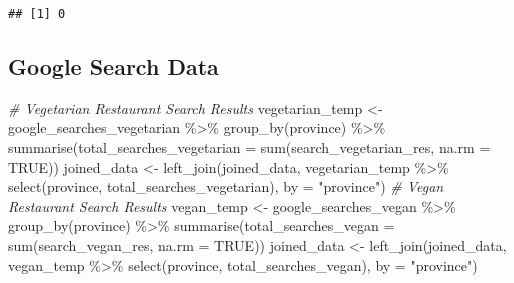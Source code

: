 \documentclass[
]{article}
\newenvironment{Shaded}{\begin{snugshade}}{\end{snugshade}}
\newcommand{\AttributeTok}[1]{\textcolor[rgb]{0.77,0.63,0.00}{#1}}
\newcommand{\CommentTok}[1]{\textcolor[rgb]{0.56,0.35,0.01}{\textit{#1}}}
\newcommand{\ConstantTok}[1]{\textcolor[rgb]{0.00,0.00,0.00}{#1}}
\newcommand{\FunctionTok}[1]{\textcolor[rgb]{0.00,0.00,0.00}{#1}}
\newcommand{\NormalTok}[1]{#1}
\newcommand{\OtherTok}[1]{\textcolor[rgb]{0.56,0.35,0.01}{#1}}
\newcommand{\SpecialCharTok}[1]{\textcolor[rgb]{0.00,0.00,0.00}{#1}}
\newcommand{\StringTok}[1]{\textcolor[rgb]{0.31,0.60,0.02}{#1}}
\begin{document}
\begin{Shaded}
\end{Shaded}

\begin{verbatim}
## [1] 0
\end{verbatim}

\hypertarget{google-search-data}{%
\subsection{Google Search Data}\label{google-search-data}}

\begin{Shaded}
\begin{Highlighting}[]
\CommentTok{\# Vegetarian Restaurant Search Results}
\NormalTok{vegetarian\_temp }\OtherTok{\textless{}{-}}\NormalTok{ google\_searches\_vegetarian }\SpecialCharTok{\%\textgreater{}\%} \FunctionTok{group\_by}\NormalTok{(province) }\SpecialCharTok{\%\textgreater{}\%} \FunctionTok{summarise}\NormalTok{(}\AttributeTok{total\_searches\_vegetarian =} \FunctionTok{sum}\NormalTok{(search\_vegetarian\_res, }\AttributeTok{na.rm =} \ConstantTok{TRUE}\NormalTok{))}
\NormalTok{joined\_data }\OtherTok{\textless{}{-}} \FunctionTok{left\_join}\NormalTok{(joined\_data, vegetarian\_temp }\SpecialCharTok{\%\textgreater{}\%} \FunctionTok{select}\NormalTok{(province, total\_searches\_vegetarian), }\AttributeTok{by =} \StringTok{"province"}\NormalTok{)}
\CommentTok{\# Vegan Restaurant Search Results}
\NormalTok{vegan\_temp }\OtherTok{\textless{}{-}}\NormalTok{ google\_searches\_vegan }\SpecialCharTok{\%\textgreater{}\%} \FunctionTok{group\_by}\NormalTok{(province) }\SpecialCharTok{\%\textgreater{}\%} \FunctionTok{summarise}\NormalTok{(}\AttributeTok{total\_searches\_vegan =} \FunctionTok{sum}\NormalTok{(search\_vegan\_res, }\AttributeTok{na.rm =} \ConstantTok{TRUE}\NormalTok{))}
\NormalTok{joined\_data }\OtherTok{\textless{}{-}} \FunctionTok{left\_join}\NormalTok{(joined\_data, vegan\_temp }\SpecialCharTok{\%\textgreater{}\%} \FunctionTok{select}\NormalTok{(province, total\_searches\_vegan), }\AttributeTok{by =} \StringTok{"province"}\NormalTok{)}
\end{Highlighting}
\end{Shaded}
\end{document}
